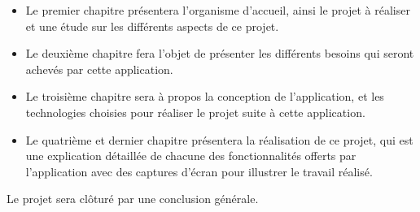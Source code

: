 \begin{small}
    \begin{itemize}
        \item Le premier chapitre présentera l'organisme d'accueil, ainsi le projet à réaliser et une étude sur les différents aspects de ce projet.
        \item Le deuxième chapitre fera l'objet de présenter les différents besoins qui seront achevés par cette application.
        \item Le troisième chapitre sera à propos la conception de l'application, et les technologies choisies pour réaliser le projet suite à cette application.
        \item Le quatrième et dernier chapitre présentera la réalisation de ce projet, qui est une explication détaillée de chacune des fonctionnalités offerts par l'application avec des captures d'écran pour illustrer le travail réalisé.
    \end{itemize}

    \noindent Le projet sera clôturé par une conclusion générale.
\end{small}